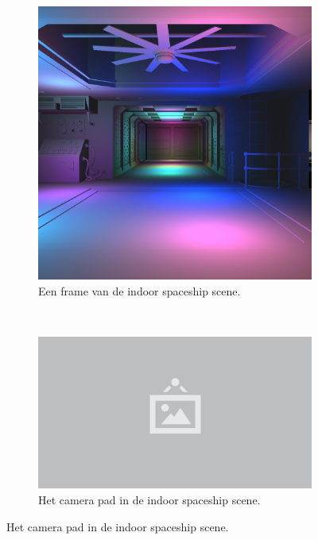 \begin{figure}[p]
  \centering
  \begin{subfigure}[b]{.95\textwidth}
    \centering\includegraphics[width=\textwidth]{./img/raw/test-suite-spaceship-indoor-frame.png}
    \caption{Een frame van de indoor spaceship scene.}\label{fig:test-suite-spaceship:frame}
  \end{subfigure}
  \\
  \begin{subfigure}[b]{.33\textwidth}
    \centering\includegraphics[width=\textwidth]{./img/raw/placeholder.png}
    \caption{Het camera pad in de indoor spaceship scene.}\label{fig:test-suite-spaceship:camera}

\end{subfigure}
\end{figure}
